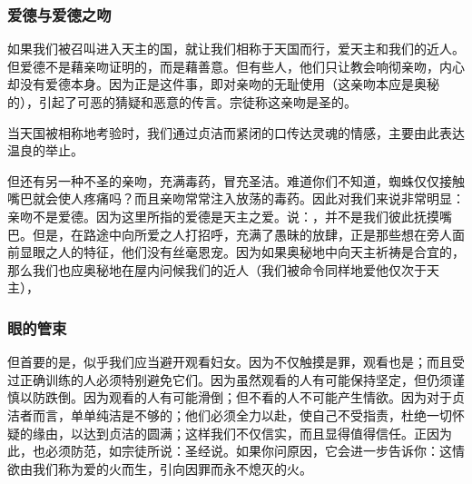 \subsubsection{爱德与爱德之吻}

如果我们被召叫进入天主的国，就让我们相称于天国而行，爱天主和我们的近人。但爱德不是藉亲吻证明的，而是藉善意。但有些人，他们只让教会响彻亲吻，内心却没有爱德本身。因为正是这件事，即对亲吻的无耻使用（这亲吻本应是奥秘的），引起了可恶的猜疑和恶意的传言。宗徒称这亲吻是圣的。\par

当天国被相称地考验时，我们通过贞洁而紧闭的口传达灵魂的情感，主要由此表达温良的举止。\par

但还有另一种不圣的亲吻，充满毒药，冒充圣洁。难道你们不知道，蜘蛛仅仅接触嘴巴就会使人疼痛吗？而且亲吻常常注入放荡的毒药。因此对我们来说非常明显：亲吻不是爱德。因为这里所指的爱德是天主之爱。说：，并不是我们彼此抚摸嘴巴。但是，在路途中向所爱之人打招呼，充满了愚昧的放肆，正是那些想在旁人面前显眼之人的特征，他们没有丝毫恩宠。因为如果奥秘地中向天主祈祷是合宜的，那么我们也应奥秘地在屋内问候我们的近人（我们被命令同样地爱他仅次于天主），\par


\subsubsection{眼的管束}

但首要的是，似乎我们应当避开观看妇女。因为不仅触摸是罪，观看也是；而且受过正确训练的人必须特别避免它们。因为虽然观看的人有可能保持坚定，但仍须谨慎以防跌倒。因为观看的人有可能滑倒；但不看的人不可能产生情欲。因为对于贞洁者而言，单单纯洁是不够的；他们必须全力以赴，使自己不受指责，杜绝一切怀疑的缘由，以达到贞洁的圆满；这样我们不仅信实，而且显得值得信任。正因为此，也必须防范，如宗徒所说：圣经说。如果你问原因，它会进一步告诉你：这情欲由我们称为爱的火而生，引向因罪而永不熄灭的火。\par

